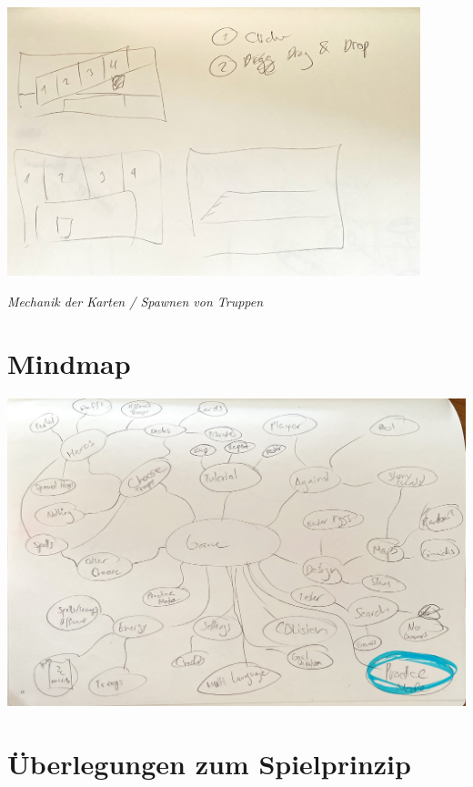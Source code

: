 \begin{center}
    \includegraphics*[width=12cm]{resources/sk_dragndrop.png}
\end{center}
\qquad \quad \enspace \textit{Mechanik der Karten / Spawnen von Truppen}

\section{Mindmap}
\begin{center}
    \includegraphics*[width=14.5cm]{resources/sk_mindmap1.png}
\end{center}


\section{Überlegungen zum Spielprinzip}

